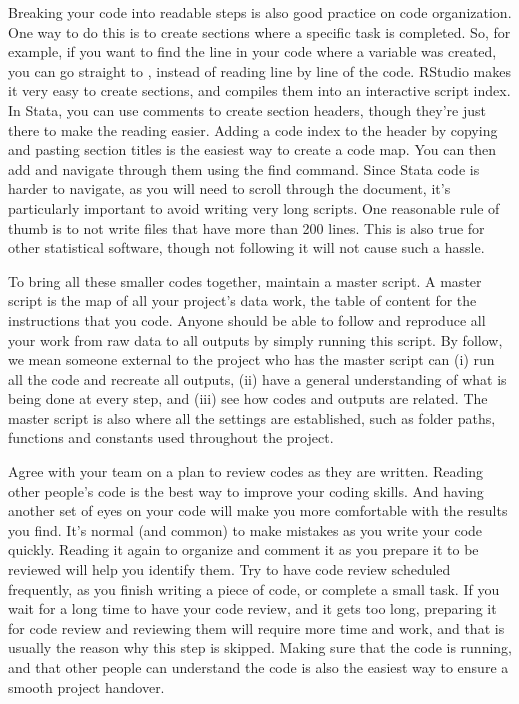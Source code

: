 Breaking your code into readable steps is also good practice on code organization. 
One way to do this is to create sections where a specific task is completed. 
So, for example, if you want to find the line in your code where a variable was created, 
you can go straight to , 
instead of reading line by line of the code.
RStudio makes it very easy to create sections, and compiles them into an interactive script index. 
In Stata, you can use comments to create section headers, 
though they're just there to make the reading easier. 
Adding a code index to the header by copying and pasting section titles is the easiest way to create a code map.
You can then add and navigate through them using the find command. 
Since Stata code is harder to navigate, as you will need to scroll through the document,
it's particularly important to avoid writing very long scripts. 
One reasonable rule of thumb is to not write files that have more than 200 lines. 
This is also true for other statistical software, 
though not following it will not cause such a hassle.

To bring all these smaller codes together, maintain a master script.
A master script is the map of all your project's data work, 
the table of content for the instructions that you code.
Anyone should be able to follow and reproduce all your work from
raw data to all outputs by simply running this script.
By follow, we mean someone external to the project who has the master script can 
(i) run all the code and recreate all outputs, 
(ii) have a general understanding of what is being done at every step, and
(iii) see how codes and outputs are related. 
The master script is also where all the settings are established, 
such as folder paths, functions and constants used throughout the project.

Agree with your team on a plan to review codes 
as they are written. 
Reading other people's code is the best way to improve your coding skills. 
And having another set of eyes on your code will make you more comfortable with the results you find. 
It's normal (and common) to make mistakes as you write your code quickly. 
Reading it again to organize and comment it as you prepare it to be reviewed will help you identify them.
Try to have code review scheduled frequently, as you finish writing a piece of code, or complete a small task.
If you wait for a long time to have your code review, and it gets too long, 
preparing it for code review and reviewing them will require more time and work, 
and that is usually the reason why this step is skipped. 
Making sure that the code is running, 
and that other people can understand the code is also the easiest way to ensure a smooth project handover.


